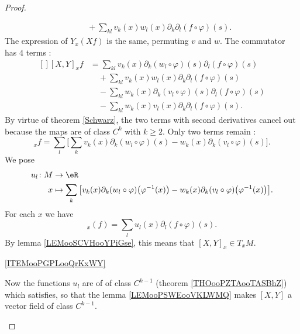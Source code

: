 \begin{proof}
\begin{subproof}
\begin{subequations}
\begin{align}
                    &\quad+\sum_{kl}v_k(x)w_l(x)\partial_k\partial_l(f\circ\varphi)(s).
                \end{align}
            \end{subequations}
            The expression of \( Y_x(Xf)\) is the same, permuting \( v\) and \( w\). The commutator has \( 4\) terms :
            \begin{equation}
                \begin{aligned}[]
                    [X,Y]_xf&=\sum_{kl}v_k(x)\partial_k(w_l\circ\varphi)(s)\partial_l(f\circ\varphi)(s)\\
                    &\quad+\sum_{kl}v_k(x)w_l(x)\partial_k\partial_l(f\circ\varphi)(s)\\
                    &\quad -\sum_{kl}w_k(x)\partial_k(v_l\circ\varphi)(s)\partial_l(f\circ\varphi)(s)\\
                    &\quad -\sum_{kl}w_k(x)v_l(x)\partial_k\partial_l(f\circ\varphi)(s).
                \end{aligned}
            \end{equation}
            By virtue of theorem \ref{Schwarz}, the two terms with second derivatives cancel out because the maps are of class \( C^k\) with \( k\geq 2\). Only two terms remain :
            \begin{equation}
                [X,Y]_xf=\sum_l\big[ \sum_kv_k(x)\partial_k(w_l\circ\varphi)(s)-w_k(x)\partial_k(v_l\circ\varphi)(s) \big].
            \end{equation}
            We pose
            \begin{equation}
                \begin{aligned}
                    u_l\colon M&\to \eR \\
                    x&\mapsto  \sum_k\big[ v_k(x)\partial_k(w_l\circ\varphi)\big( \varphi^{-1}(x) \big)-w_k(x)\partial_k(v_l\circ\varphi)\big( \varphi^{-1}(x) \big) \big].
                \end{aligned}
            \end{equation}
            For each \( x\) we have
            \begin{equation}
                [X,Y]_x(f)=\sum_lu_l(x)\partial_l(f\circ\varphi)(s).
            \end{equation}
            By lemma \ref{LEMooSCVHooYPiGse}, this means that \( [X,Y]_x\in T_xM\).

        \item[\ref{ITEMooPGPLooQrKxWY}]

            Now the functions \( u_l\) are of of class \( C^{k-1}\) (theorem \ref{THOooPZTAooTASBhZ}) which satisfies, so that the lemma \ref{LEMooPSWEooVKLWMQ} makes \( [X,Y] \) a vector field of class \( C^{k-1}\).
    \end{subproof}
\end{proof}


